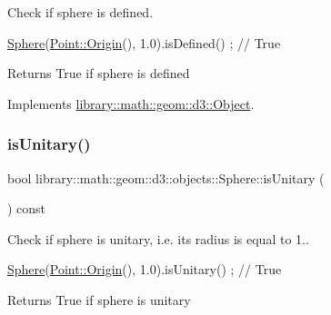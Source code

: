 Check if sphere is defined. 


\begin{DoxyCode}
\hyperlink{classlibrary_1_1math_1_1geom_1_1d3_1_1objects_1_1_sphere_a55dccc8ea16ee55cd7694c26afa8ea39}{Sphere}(\hyperlink{classlibrary_1_1math_1_1geom_1_1d3_1_1objects_1_1_point_ab2a38e285c562e50bf350272c083986f}{Point::Origin}(), 1.0).isDefined() ; \textcolor{comment}{// True}
\end{DoxyCode}


\begin{DoxyReturn}{Returns}
True if sphere is defined 
\end{DoxyReturn}


Implements \hyperlink{classlibrary_1_1math_1_1geom_1_1d3_1_1_object_a2216442e322f0c3ca5f01a4efa22baf7}{library\+::math\+::geom\+::d3\+::\+Object}.

\mbox{\label{classlibrary_1_1math_1_1geom_1_1d3_1_1objects_1_1_sphere_a5ec4120b51da519ec14e8bded930b742}} 
\subsubsection{\texorpdfstring{is\+Unitary()}{isUnitary()}}
{\footnotesize\ttfamily bool library\+::math\+::geom\+::d3\+::objects\+::\+Sphere\+::is\+Unitary (\begin{DoxyParamCaption}{ }\end{DoxyParamCaption}) const}



Check if sphere is unitary, i.\+e. its radius is equal to 1.. 


\begin{DoxyCode}
\hyperlink{classlibrary_1_1math_1_1geom_1_1d3_1_1objects_1_1_sphere_a55dccc8ea16ee55cd7694c26afa8ea39}{Sphere}(\hyperlink{classlibrary_1_1math_1_1geom_1_1d3_1_1objects_1_1_point_ab2a38e285c562e50bf350272c083986f}{Point::Origin}(), 1.0).isUnitary() ; \textcolor{comment}{// True}
\end{DoxyCode}


\begin{DoxyReturn}{Returns}
True if sphere is unitary 
\end{DoxyReturn}
\mbox{\label{classlibrary_1_1math_1_1geom_1_1d3_1_1objects_1_1_sphere_a127131c48a3bfe342508630cfd399fae}} 
